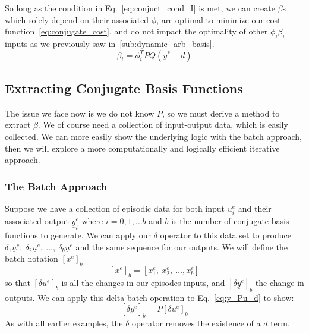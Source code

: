 So long as the condition in Eq.~\ref{eq:conjuct_cond_I} is met, we can create $\beta$s which solely depend on their associated $\phi$, are optimal to minimize our cost function~\ref{eq:conjugate_cost}, and do not impact the optimality of other $\phi_i \beta_i$ inputs as we previously saw in~\ref{sub:dynamic_arb_basis}.
\begin{equation}
    \beta_i = \phi_i^T P Q (\underline{y}^\ast - \underline{d})
    \label{eq:optimal_beta_lql}
\end{equation}

\FloatBarrier\subsection{Extracting Conjugate Basis Functions}
The issue we face now is we do not know $P$, so we must derive a method to extract $\beta$. We of course need a collection of input-output data, which is easily collected. We can more easily show the underlying logic with the batch approach, then we will explore a more computationally and logically efficient iterative approach.

\FloatBarrier\subsubsection{The Batch Approach}
Suppose we have a collection of episodic data for both input $\underline{u}_i^e$ and their associated output $\underline{y}_i^e$ where $i = 0, 1, \dots b$ and $b$ is the number of conjugate basis functions to generate. We can apply our $\delta$ operator to this data set to produce $\delta_1 \underline{u}^e,\ \delta_2 \underline{u}^e,\ \dots,\ \delta_b \underline{u}^e$ and the same sequence for our outputs. We will define the batch notation ${\left[{x}^e\right]}_b$
\begin{equation}
    {\left[{x}^e\right]}_b  = \left[{x}_1^e,\ {x}_2^e,\ \dots, {x}_b^e\right]
\end{equation}
so that ${\left[\delta\underline{u}^e\right]}_b$ is all the changes in our episodes inputs, and ${\left[\delta\underline{y}^e\right]}_b$ the change in outputs. We can apply this delta-batch operation to Eq.~\ref{eq:y_Pu_d} to show:
\begin{equation}
    {\left[\delta\underline{y}^e\right]}_b = P {\left[\delta\underline{u}^e\right]}_b
    \label{eq:del_y_batch_P_del_u_batch}
\end{equation}
As with all earlier examples, the $\delta$ operator removes the existence of a $\underline{d}$ term.

